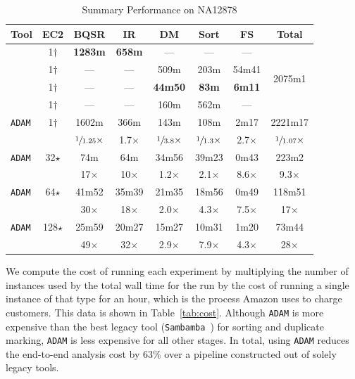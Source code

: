 \documentclass{sig-alternate}
\begin{document}
\begin{table}[h]
\centering
\tiny
\caption{Summary Performance on NA12878}
\label{tab:overview}
\begin{tabular}{ l | c | c c c c c | c }
\hline
\bf Tool & \bf EC2 & \bf BQSR & \bf IR & \bf DM & \bf Sort & \bf FS & \bf Total \\
\hline
\hline
\cite{depristo11} & 1$\dagger$ & \bf 1283m & \bf 658m & --- & --- & --- & \multirow{4}{*}{2075m1} \\
\cite{li11} & 1$\dagger$ & --- & --- & 509m & 203m & 54m41 & \\
\cite{tarasov15} & 1$\dagger$ & --- & --- & \bf 44m50 & \bf 83m & \bf 6m11 & \\
\cite{picard} & 1$\dagger$ & --- & --- & 160m & 562m & --- & \\
\hline
\texttt{ADAM} & 1$\dagger$ & 1602m & 366m & 143m & 108m & 2m17 & 2221m17 \\
 & & $\sfrac{1}{1.25}\times$ & 1.7$\times$ & $\sfrac{1}{3.8}\times$ & $\sfrac{1}{1.3}\times$ & 2.7$\times$ & $\sfrac{1}{1.07}\times$ \\
\hline
\texttt{ADAM} & 32$\star$ & 74m & 64m & 34m56 & 39m23 & 0m43 & 223m2 \\
 & & 17$\times$ & 10$\times$ & 1.2$\times$ & 2.1$\times$ & 8.6$\times$ & 9.3$\times$ \\
\hline
\texttt{ADAM} & 64$\star$ & 41m52 & 35m39 & 21m35 & 18m56 & 0m49 & 118m51 \\
 & & 30$\times$ & 18$\times$ & 2.0$\times$ & 4.3$\times$ & 7.5$\times$ & 17$\times$ \\
\hline
\texttt{ADAM} & 128$\star$ & 25m59 & 20m27 & 15m27 & 10m31 & 1m20 & 73m44 \\
 & & 49$\times$ & 32$\times$ & 2.9$\times$ & 7.9$\times$ & 4.3$\times$ & 28$\times$ \\
\end{tabular}
\end{table}

We compute the cost of running each experiment by multiplying the number of instances
used by the total wall time for the run by the cost of running a single instance of that type for an hour, which is
the process Amazon uses to charge customers. This data is shown in Table~\ref{tab:cost}. Although \texttt{ADAM}
is more expensive than the best legacy tool (\texttt{Sambamba}~\cite{tarasov15}) for sorting and duplicate marking,
\texttt{ADAM} is less expensive for all other stages. In total, using \texttt{ADAM} reduces the end-to-end analysis cost
by 63\% over a pipeline constructed out of solely legacy tools.
\end{document}
